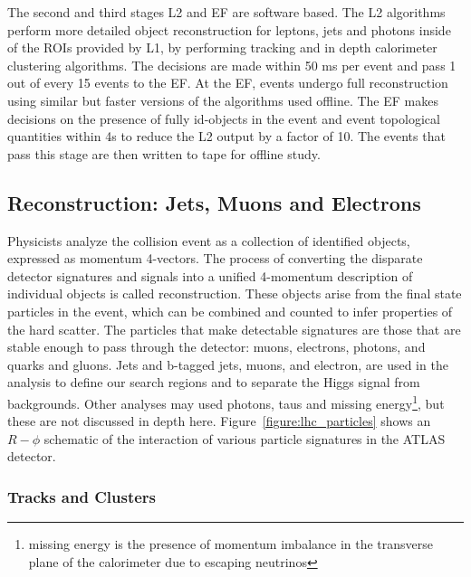 The second and third stages L2 and EF are software based. The L2 algorithms perform more detailed object reconstruction for leptons, jets and photons inside of the ROIs provided by L1, by performing tracking and in depth calorimeter clustering algorithms. The decisions are made within 50 ms per event and pass 1 out of every 15 events to the EF. At the EF, events undergo full reconstruction using similar but faster versions of the algorithms used offline. The EF makes decisions on the presence of fully id-objects in the event and event topological quantities within 4s to reduce the L2 output by a factor of 10. The events that pass this stage are then written to tape for offline study.



\subsection{Reconstruction: Jets, Muons and Electrons}

Physicists analyze the collision event as a collection of identified objects, expressed as momentum 4-vectors. The process of converting the disparate detector signatures and signals into a unified 4-momentum description of individual objects is called reconstruction. These objects arise from the final state particles in the event, which can be combined and counted to infer properties of the hard scatter. The particles that make detectable signatures are those that are stable enough to pass through the detector: muons, electrons, photons, and quarks and gluons. Jets and b-tagged jets, muons, and electron, are used in the \tth analysis to define our search regions and to separate the Higgs signal from backgrounds. Other analyses may used photons, taus and missing energy\footnote{missing energy is the presence of momentum imbalance in the transverse plane of the calorimeter due to escaping neutrinos}, but these are not discussed in depth here. Figure~\ref{figure:lhc_particles} shows an $R-\phi$ schematic of the interaction of various particle signatures in the ATLAS detector.  

 

\subsubsection{Tracks and Clusters}

